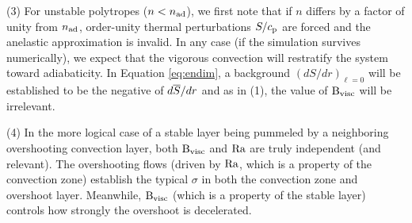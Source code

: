 \documentclass[12pt]{article}
\numberwithin{equation}{section}
\newcommand{\nad}{n_{\rm{ad}}}
\begin{document}
(3) For unstable polytropes ($n<\nad$), we first note that if $n$ differs by a factor of unity from $\nad$, order-unity thermal perturbations $S/c_{\rm{p}}$ are forced and the anelastic approximation is invalid. In any case (if the simulation survives numerically), we expect that the vigorous convection will restratify the system toward adiabaticity. In Equation \eqref{eq:endim}, a background $(dS/dr)_{\ell=0}$ will be established to be the negative of $d\overline{S}/dr$ and as in (1), the value of ${\rm{B_{visc}}}$ will be irrelevant. 

(4) In the more logical case of a stable layer being pummeled by a neighboring overshooting convection layer, both ${\rm{B_{visc}}}$ and ${\rm{Ra}}$ are truly independent (and relevant). The overshooting flows (driven by ${\rm{Ra}}$, which is a property of the convection zone) establish the typical $\sigma$ in both the convection zone and overshoot layer. Meanwhile, ${\rm{B_{visc}}}$ (which is a property of the stable layer) controls how strongly the overshoot is decelerated. 
\end{document}
